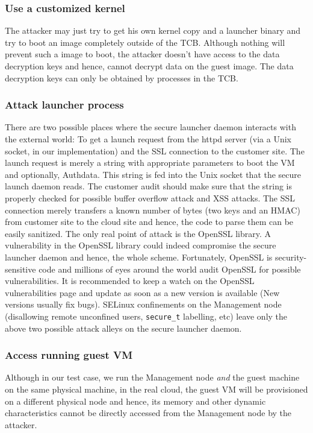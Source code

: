 \documentclass[10pt,twocolumn,pdftex]{article}
\begin{document}
\subsubsection{Use a customized kernel}
The attacker may just try to get his own kernel copy and a launcher binary and try to boot an image completely outside of the TCB. Although nothing will prevent such a image to boot, the attacker doesn't have access to the data decryption keys and hence, cannot decrypt data on the guest image. The data decryption keys can only be obtained by processes in the TCB.

\subsubsection{Attack launcher process}
There are two possible places where the secure launcher daemon interacts with the external world: To get a launch request from the httpd server (via a Unix socket, in our implementation) and the SSL connection to the customer site. The launch request is merely a string with appropriate parameters to boot the VM and optionally, Authdata. This string is fed into the Unix socket that the secure launch daemon reads. The customer audit should make sure that the string is properly checked for possible buffer overflow attack and XSS attacks. The SSL connection merely transfers a known number of bytes (two keys and an HMAC) from customer site to the cloud site and hence, the code to parse them can be easily sanitized. The only real point of attack is the OpenSSL library. A vulnerability in the OpenSSL library could indeed compromise the secure launcher daemon and hence, the whole scheme. Fortunately, OpenSSL is security-sensitive code and millions of eyes around the world audit OpenSSL for possible vulnerabilities. It is recommended to keep a watch on the OpenSSL vulnerabilities page \cite{openssl-vulnerabilities} and update as soon as a new version is available (New versions usually fix bugs). 
SELinux confinements on the Management node (disallowing remote unconfined users, {\tt secure\_t} labelling, etc) leave only the above two possible attack alleys on the secure launcher daemon.

\subsubsection{Access running guest VM}
Although in our test case, we run the Management node \emph{and} the guest machine on the same physical machine, in the real cloud, the guest VM will be provisioned on a different physical node and hence, its memory and other dynamic characteristics cannot be directly accessed from the Management node by the attacker.
\end{document}
